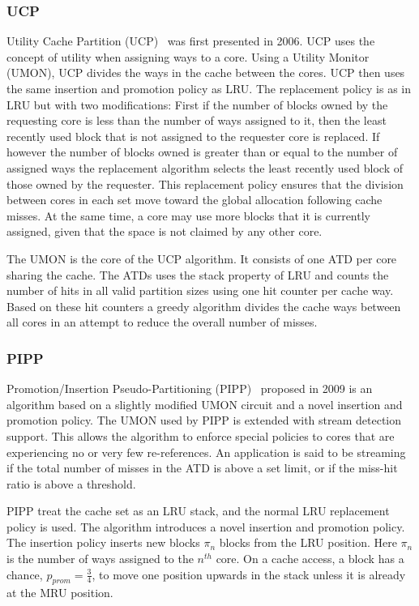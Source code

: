 \subsubsection{UCP}

Utility Cache Partition (UCP)~\cite{Qureshi2006} was first presented in 2006. 
UCP uses the concept of utility when assigning ways to a core.
Using a Utility Monitor (UMON), UCP divides the ways in the cache between the cores.
UCP then uses the same insertion and promotion policy as LRU.
The replacement policy is as in LRU but with two modifications:
First if the number of blocks owned by the requesting core is less than the number of ways assigned to it, then the least recently used block that is not assigned to the requester core is replaced.
If however the number of blocks owned is greater than or equal to the number of assigned ways the replacement algorithm selects the least recently used block of those owned by the requester.
This replacement policy ensures that the division between cores in each set move toward the global allocation following cache misses.
At the same time, a core may use more blocks that it is currently assigned, given that the space is not claimed by any other core.

The UMON is the core of the UCP algorithm.
It consists of one ATD per core sharing the cache. 
The ATDs uses the stack property of LRU and counts the number of hits in all valid partition sizes using one hit counter per cache way.
Based on these hit counters a greedy algorithm divides the cache ways between all cores in an attempt to reduce the overall number of misses.

\subsubsection{PIPP}

Promotion/Insertion Pseudo-Partitioning (PIPP)~\cite{Xie2009} proposed in 2009 is an algorithm based on a slightly modified UMON circuit and a novel insertion and promotion policy.
The UMON used by PIPP is extended with stream detection support.
This allows the algorithm to enforce special policies to cores that are experiencing no or very few re-references.
An application is said to be streaming if the total number of misses in the ATD is above a set limit, or if the miss-hit ratio is above a threshold.

PIPP treat the cache set as an LRU stack, and the normal LRU replacement policy is used.
The algorithm introduces a novel insertion and promotion policy.
The insertion policy inserts new blocks $\pi_n$ blocks from the LRU position. 
Here $\pi_n$ is the number of ways assigned to the $n^{th}$ core.
On a cache access, a block has a chance, $p_{prom} = \frac{3}{4}$, to move one position upwards in the stack unless it is already at the MRU position.


